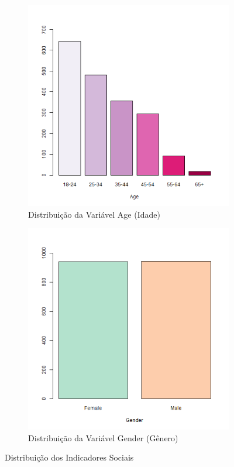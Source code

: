 \documentclass[
	article,			%
	11pt,				%
	oneside,			%
	a4paper,			%
	english,			%
	brazil,				%
	sumario=tradicional
	]{abntex2}
\begin{document}
\begin{figure}[H]
\centering
\begin{subfigure}{.5\textwidth}
  \centering
  \includegraphics[width=\linewidth]{figuras/dist_idade.png}
  \caption{Distribuição da Variável Age (Idade)}
  \label{soc_idade}
\end{subfigure}%
\begin{subfigure}{.5\textwidth}
  \centering
  \includegraphics[width=\linewidth]{figuras/dist_genero.png}
  \caption{Distribuição da Variável Gender (Gênero)}
  \label{soc_genero}
\end{subfigure}
\caption{Distribuição dos Indicadores Sociais}
\label{soc1}
\end{figure}
\end{document}
